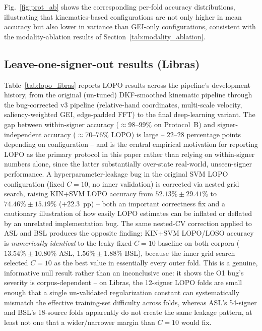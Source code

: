 \documentclass[journal]{IEEEtran}
\begin{document}
Fig.~\ref{fig:prot_ab} shows the corresponding per-fold accuracy distributions, illustrating that kinematics-based configurations are not only higher in mean accuracy but also lower in variance than GEI-only configurations, consistent with the modality-ablation results of Section~\ref{tab:modality_ablation}.

\subsection{Leave-one-signer-out results (Libras)}

Table~\ref{tab:lopo_libras} reports LOPO results across the pipeline's development history, from the original (un-tuned) DKF-smoothed kinematic pipeline through the bug-corrected v3 pipeline (relative-hand coordinates, multi-scale velocity, saliency-weighted GEI, edge-padded FFT) to the final deep-learning variant. The gap between within-signer accuracy ($\approx$98--99\% on Protocol~B) and signer-independent accuracy ($\approx$70--76\% LOPO) is large -- $22$--$28$ percentage points depending on configuration -- and is the central empirical motivation for reporting LOPO as the primary protocol in this paper rather than relying on within-signer numbers alone, since the latter substantially over-state real-world, unseen-signer performance. A hyperparameter-leakage bug in the original SVM LOPO configuration (fixed $C=10$, no inner validation) is corrected via nested grid search, raising KIN+SVM LOPO accuracy from $52.13\%\pm29.41\%$ to $74.46\%\pm15.19\%$ ($+22.3$~pp) -- both an important correctness fix and a cautionary illustration of how easily LOPO estimates can be inflated or deflated by an unrelated implementation bug. The same nested-CV correction applied to ASL and BSL produces the opposite finding: KIN+SVM LOPO/LOSO accuracy is \emph{numerically identical} to the leaky fixed-$C{=}10$ baseline on both corpora ($13.54\%\pm10.80\%$ ASL, $1.56\%\pm1.88\%$ BSL), because the inner grid search selected $C{=}10$ as the best value in essentially every outer fold. This is a genuine, informative null result rather than an inconclusive one: it shows the O1 bug's severity is corpus-dependent -- on Libras, the 12-signer LOPO folds are small enough that a single un-validated regularization constant can systematically mismatch the effective training-set difficulty across folds, whereas ASL's 54-signer and BSL's 18-source folds apparently do not create the same leakage pattern, at least not one that a wider/narrower margin than $C=10$ would fix.
\end{document}
